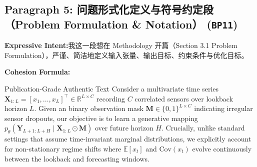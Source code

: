 \subsection*{Paragraph 5: 问题形式化定义与符号约定段（Problem Formulation \& Notation） (\texttt{BP11})}
\noindent\textbf{Expressive Intent:}\enspace 我这一段想在 Methodology 开篇（Section 3.1 Problem Formulation），严谨、简洁地定义输入张量、输出目标、约束条件与优化目标。\par
\noindent\textbf{Cohesion Formula:}\par\vspace{4pt}
\begin{ExampleBox}{Publication-Grade Authentic Text}
Consider a multivariate time series $\mathbf{X}_{1:L} = [x_1, \dots, x_L]^\top \in \mathbb{R}^{L \times C}$ recording $C$ correlated sensors over lookback horizon $L$. Given an binary observation mask $\mathbf{M} \in \{0, 1\}^{L \times C}$ indicating irregular sensor dropouts, our objective is to learn a generative mapping $p_\theta(\mathbf{Y}_{L+1:L+H} \mid \mathbf{X}_{1:L} \odot \mathbf{M})$ over future horizon $H$. Crucially, unlike standard settings that assume time-invariant marginal distributions, we explicitly account for non-stationary regime shifts where $\mathbb{E}[x_t]$ and $\text{Cov}(x_t)$ evolve continuously between the lookback and forecasting windows.
\end{ExampleBox}
